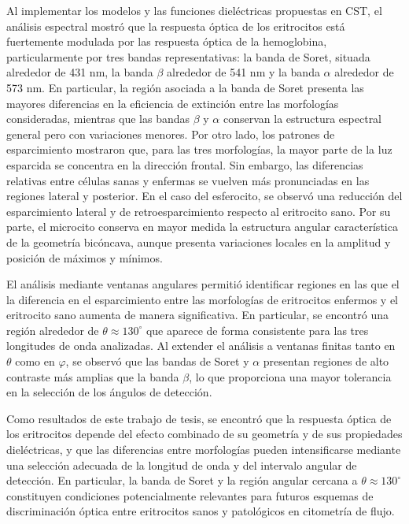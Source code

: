 Al implementar los modelos y las funciones dieléctricas propuestas en CST, el análisis espectral mostró que la respuesta óptica de los eritrocitos está fuertemente modulada por las respuesta óptica de la hemoglobina, particularmente por tres bandas representativas: la banda de Soret, situada alrededor de 431 nm, la banda $\beta$ alrededor de 541 nm y la banda $\alpha$ alrededor de 573 nm. En particular, la región asociada a la banda de Soret presenta las mayores diferencias en la eficiencia de extinción entre las morfologías consideradas, mientras que las bandas $\beta$ y $\alpha$ conservan la estructura espectral general pero con variaciones menores. Por otro lado, los patrones de esparcimiento mostraron que, para las tres morfologías, la mayor parte de la luz esparcida se concentra en la dirección frontal. Sin embargo, las diferencias relativas entre células sanas y enfermas se vuelven más pronunciadas en las regiones lateral y posterior. En el caso del esferocito, se observó una reducción del esparcimiento lateral y de retroesparcimiento respecto al eritrocito sano. Por su parte, el microcito conserva en mayor medida la estructura angular característica de la geometría bicóncava, aunque presenta variaciones locales en la amplitud y posición de máximos y mínimos.

El análisis mediante ventanas angulares permitió identificar regiones en las que el la diferencia en el esparcimiento entre las morfologías de eritrocitos enfermos y el eritrocito sano aumenta de manera significativa. En particular, se encontró una región alrededor de $\theta\approx130^\circ$ que aparece de forma consistente para las tres longitudes de onda analizadas. Al extender el análisis a ventanas finitas tanto en $\theta$ como en $\varphi$, se observó que las bandas de Soret y $\alpha$ presentan regiones de alto contraste más amplias que la banda $\beta$, lo que proporciona una mayor tolerancia en la selección de los ángulos de detección.

Como resultados de este trabajo de tesis, se encontró que la respuesta óptica de los eritrocitos depende del efecto combinado de su geometría y de sus propiedades dieléctricas, y que las diferencias entre morfologías pueden intensificarse mediante una selección adecuada de la longitud de onda y del intervalo angular de detección. En particular, la banda de Soret y la región angular cercana a $\theta\approx130^\circ$ constituyen condiciones potencialmente relevantes para futuros esquemas de discriminación óptica entre eritrocitos sanos y patológicos en citometría de flujo.

 

